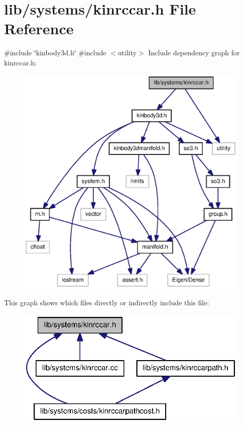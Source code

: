 \section{lib/systems/kinrccar.h \-File \-Reference}
\label{kinrccar_8h}
{\ttfamily \#include \char`\"{}kinbody3d.\-h\char`\"{}}\*
{\ttfamily \#include $<$utility$>$}\*
\-Include dependency graph for kinrccar.\-h\-:\nopagebreak
\begin{figure}[H]
\begin{center}
\leavevmode
\includegraphics[width=350pt]{kinrccar_8h__incl}
\end{center}
\end{figure}
\-This graph shows which files directly or indirectly include this file\-:
\nopagebreak
\begin{figure}[H]
\begin{center}
\leavevmode
\includegraphics[width=323pt]{kinrccar_8h__dep__incl}
\end{center}
\end{figure}
